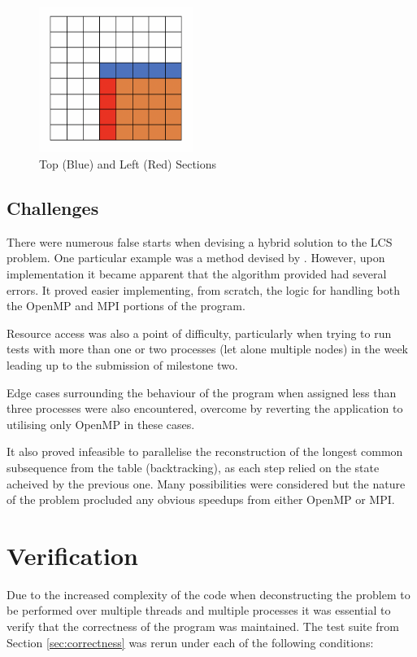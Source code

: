 \begin{figure}[h]
\centering
\includegraphics[width=5cm]{img/topleft.png}
\caption{Top (Blue) and Left (Red) Sections}
\label{fig:topleft}
\end{figure}

\subsection{Challenges}
There were numerous false starts when devising a hybrid solution to the LCS problem. One particular example was a method devised by \cite{Li2017}. However, upon implementation it became apparent that the algorithm provided had several errors. It proved easier implementing, from scratch, the logic for handling both the OpenMP and MPI portions of the program.

Resource access was also a point of difficulty, particularly when trying to run tests with more than one or two processes (let alone multiple nodes) in the week leading up to the submission of milestone two.

Edge cases surrounding the behaviour of the program when assigned less than three processes were also encountered, overcome by reverting the application to utilising only OpenMP in these cases.

It also proved infeasible to parallelise the reconstruction of the longest common subsequence from the table (backtracking), as each step relied on the state acheived by the previous one. Many possibilities were considered but the nature of the problem procluded any obvious speedups from either OpenMP or MPI.

\section{Verification}
Due to the increased complexity of the code when deconstructing the problem to be performed over multiple threads and multiple processes it was essential to verify that the correctness of the program was maintained. The test suite from Section \ref{sec:correctness} was rerun under each of the following conditions:

